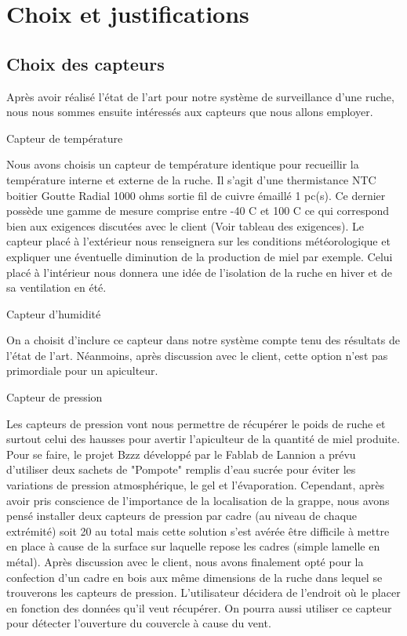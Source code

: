 \chapter{Choix et justifications}

\section{Choix des capteurs}

Après avoir réalisé l'état de l'art pour notre système de surveillance d'une ruche, nous nous sommes ensuite intéressés aux capteurs que nous allons employer.

Capteur de température

Nous avons choisis un capteur de température identique pour recueillir la température interne et externe de la ruche.
Il s'agit d'une thermistance NTC boitier Goutte Radial 1000 ohms sortie fil de cuivre émaillé 1 pc(s). Ce dernier possède une gamme de mesure comprise entre -40 C et 100 C ce qui correspond bien aux exigences discutées avec le client (Voir tableau des exigences). Le capteur placé à l'extérieur nous renseignera sur les conditions météorologique et expliquer une éventuelle diminution de la production de miel par exemple. Celui placé à l'intérieur nous donnera une idée de l'isolation de la ruche en hiver et de sa ventilation en été.  

Capteur d'humidité

On a choisit d'inclure ce capteur dans notre système compte tenu des résultats de l'état de l'art. Néanmoins, après discussion avec le client, cette option n'est pas primordiale pour un apiculteur.

Capteur de pression

Les capteurs de pression vont nous permettre de récupérer le poids de ruche et surtout celui des hausses pour avertir l'apiculteur de la quantité de miel produite. Pour se faire, le projet Bzzz développé par le Fablab de Lannion a prévu d'utiliser deux sachets de "Pompote" remplis d'eau sucrée pour éviter les variations de pression atmosphérique, le gel et l'évaporation. Cependant, après avoir pris conscience de l'importance de la localisation de la grappe, nous avons pensé installer deux capteurs de pression par cadre (au niveau de chaque extrémité) soit 20 au total mais cette solution s'est avérée être difficile à mettre en place à cause de la surface sur laquelle repose les cadres (simple lamelle en métal). Après discussion avec le client, nous avons finalement opté pour la confection d'un cadre en bois aux même dimensions de la ruche dans lequel se trouverons les capteurs de pression. L'utilisateur décidera de l'endroit où le placer en fonction des données qu'il veut récupérer. 
On pourra aussi utiliser ce capteur pour détecter l'ouverture du couvercle à cause du vent.    


